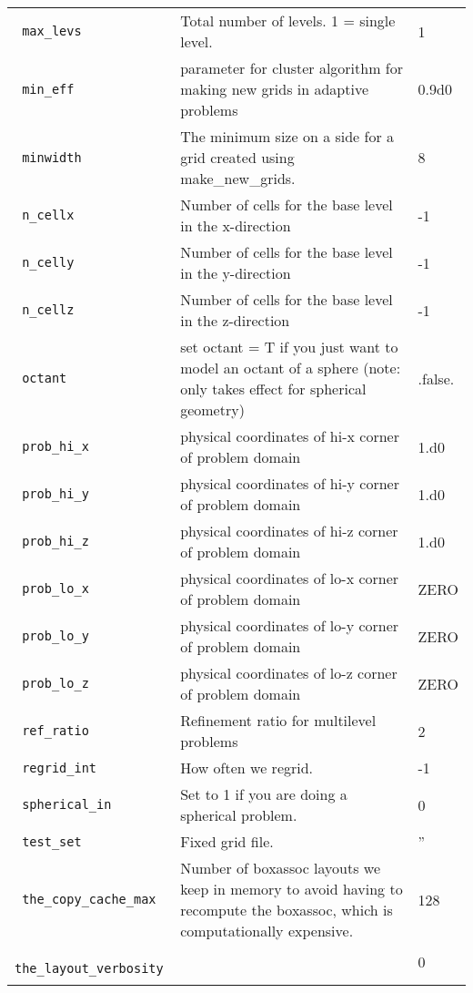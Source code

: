 \begin{landscape}
{\begin{center}
\begin{longtable}{|l|p{5.25in}|l|}
\verb= max_levs = &  Total number of levels.  1 = single level. & 1 \\
\rowcolor{tableShade}
\verb= min_eff = &  parameter for cluster algorithm for making new grids in adaptive problems & 0.9d0 \\
\verb= minwidth = &  The minimum size on a side for a grid created using make\_new\_grids. & 8 \\
\rowcolor{tableShade}
\verb= n_cellx = &  Number of cells for the base level in the x-direction & -1 \\
\verb= n_celly = &  Number of cells for the base level in the y-direction & -1 \\
\rowcolor{tableShade}
\verb= n_cellz = &  Number of cells for the base level in the z-direction & -1 \\
\verb= octant = &  set octant = T if you just want to model an octant of a sphere (note: only takes effect for spherical geometry) & .false. \\
\rowcolor{tableShade}
\verb= prob_hi_x = &  physical coordinates of hi-x corner of problem domain & 1.d0 \\
\verb= prob_hi_y = &  physical coordinates of hi-y corner of problem domain & 1.d0 \\
\rowcolor{tableShade}
\verb= prob_hi_z = &  physical coordinates of hi-z corner of problem domain & 1.d0 \\
\verb= prob_lo_x = &  physical coordinates of lo-x corner of problem domain & ZERO \\
\rowcolor{tableShade}
\verb= prob_lo_y = &  physical coordinates of lo-y corner of problem domain & ZERO \\
\verb= prob_lo_z = &  physical coordinates of lo-z corner of problem domain & ZERO \\
\rowcolor{tableShade}
\verb= ref_ratio = &  Refinement ratio for multilevel problems & 2 \\
\verb= regrid_int = &  How often we regrid. & -1 \\
\rowcolor{tableShade}
\verb= spherical_in = &  Set to 1 if you are doing a spherical problem. & 0 \\
\verb= test_set = &  Fixed grid file. & '' \\
\rowcolor{tableShade}
\verb= the_copy_cache_max = &   Number of boxassoc layouts we keep in memory to avoid having to recompute the boxassoc, which is computationally expensive. & 128 \\
\verb= the_layout_verbosity = &  & 0 \\
\rowcolor{tableShade}

\end{longtable}
\end{center}}
\end{landscape}
